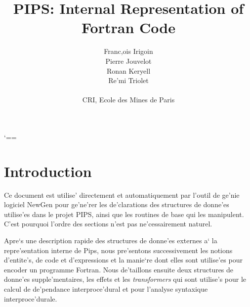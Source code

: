 
% 

\title{PIPS: Internal Representation of Fortran Code}
\author{Franc,ois Irigoin \\
        Pierre Jouvelot \\
    Ronan Keryell \\
        Re'mi Triolet\\
\\
        CRI, Ecole des Mines de Paris}

      {
        \catcode `==\active
        \gdef\domain{\medskip\par\noindent
          \bgroup
          \catcode `_ \other
          \catcode `= \active
          \def={\em{\rm \string=}}
          \tt\em\vraidomain}
        \gdef\vraidomain#1{#1\egroup\medskip\par}
        }



\maketitle
\sloppy

\section*{Introduction}

Ce document est utilise' directement et automatiquement par l'outil
de ge'nie logiciel NewGen pour ge'ne'rer les de'clarations des structures
de donne'es utilise'es dans le projet PIPS, ainsi que les routines de
base qui les manipulent. C'est pourquoi l'ordre des sections n'est pas
ne'cessairement naturel.

Apre`s une description rapide des structures de donne'es externes a` la
repre'sentation interne de Pips, nous pre'sentons successivement les
notions d'entite's, de code et d'expressions et la manie`re dont elles
sont utilise'es pour encoder un programme Fortran. Nous de'taillons
ensuite deux structures de donne'es supple'mentaires, les effets et les
{\em transformers} qui sont utilise's pour le calcul de de'pendance
interproce'dural et pour l'analyse syntaxique interproce'durale.

